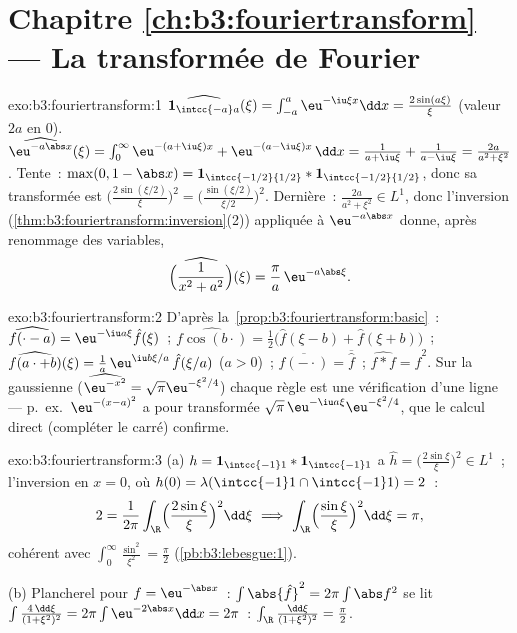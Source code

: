 \section*{Chapitre \ref{ch:b3:fouriertransform} --- La
transformée de Fourier}

\begin{solution}{exo:b3:fouriertransform:1}
$\widehat{\mathbf 1_{\intcc{-a}a}}(\xi) =
\int_{-a}^a\eu^{-\iu\xi x}\dd x = \frac{2\sin(a\xi)}{\xi}$
(valeur $2a$ en $0$).
$\widehat{\eu^{-a\abs x}}(\xi) = \int_0^\infty\eu^{-(a +
\iu\xi)x} + \eu^{-(a - \iu\xi)x}\,\dd x = \frac1{a + \iu\xi} +
\frac1{a - \iu\xi} = \frac{2a}{a^2 + \xi^2}$.
Tente~: $\max(0, 1 - \abs x) = \mathbf 1_{\intcc{-1/2}{1/2}} *
\mathbf 1_{\intcc{-1/2}{1/2}}$, donc sa transformée est
$\bigl(\frac{2\sin(\xi/2)}\xi\bigr)^2 =
\bigl(\frac{\sin(\xi/2)}{\xi/2}\bigr)^2$.
Dernière~: $\frac{2a}{a^2+\xi^2} \in L^1$, donc l'inversion
(\cref{thm:b3:fouriertransform:inversion}(2)) appliquée à
$\eu^{-a\abs x}$ donne, après renommage des variables,
\[
\widehat{\Bigl(\frac1{x^2 + a^2}\Bigr)}(\xi) =
\frac{\pi}{a}\,\eu^{-a\abs\xi} .
\]
\end{solution}

\begin{solution}{exo:b3:fouriertransform:2}
D'après la~\cref{prop:b3:fouriertransform:basic}~:
$\widehat{f(\cdot - a)} = \eu^{-\iu a\xi}\hat f(\xi)$~;
$\widehat{f\cos(b\cdot)} = \frac12\bigl(\hat f(\xi - b) + \hat
f(\xi + b)\bigr)$~;
$\widehat{f(a\cdot + b)}(\xi) = \frac1a\,\eu^{\iu
b\xi/a}\,\hat f(\xi/a)$ ($a > 0$)~;
$\widehat{\overline{f(-\cdot)}} = \overline{\hat f}$~;
$\widehat{f * f} = \hat f^2$. Sur la gaussienne
($\widehat{\eu^{-x^2}} = \sqrt\pi\eu^{-\xi^2/4}$) chaque règle
est une vérification d'une ligne --- p.\ ex.\ $\eu^{-(x-a)^2}$
a pour transformée $\sqrt\pi\,\eu^{-\iu a\xi}\eu^{-\xi^2/4}$,
que le calcul direct (compléter le carré) confirme.
\end{solution}

\begin{solution}{exo:b3:fouriertransform:3}
(a) $h = \mathbf 1_{\intcc{-1}1}*\mathbf 1_{\intcc{-1}1}$ a
$\hat h = \bigl(\frac{2\sin\xi}\xi\bigr)^2 \in L^1$~;
l'inversion en $x = 0$, où $h(0) = \lambda(\intcc{-1}1\cap\intcc{-1}1)
= 2$~:
\[
2 = \frac1{2\pi}\int_\R\Bigl(\frac{2\sin\xi}\xi\Bigr)^2
\dd\xi
\ \Longrightarrow\
\int_\R\Bigl(\frac{\sin\xi}\xi\Bigr)^2\dd\xi = \pi ,
\]
cohérent avec $\int_0^\infty\frac{\sin^2}{\xi^2} =
\frac\pi2$ (\cref{pb:b3:lebesgue:1}).

(b) Plancherel pour $f = \eu^{-\abs x}$~: $\int\abs{\hat f}^2 =
2\pi\int\abs f^2$ se lit $\int\frac{4\,\dd\xi}{(1 + \xi^2)^2} =
2\pi\int\eu^{-2\abs x}\dd x = 2\pi$~:
$\int_\R\frac{\dd\xi}{(1+\xi^2)^2} = \frac\pi2$.
\end{solution}

